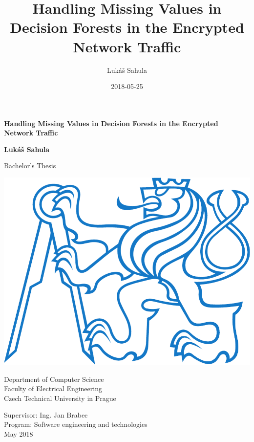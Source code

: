 \documentclass[11pt]{article}
\title{Handling Missing Values in Decision Forests in the Encrypted Network Traffic}
\date{2018-05-25}
\author{Lukáš Sahula}
\begin{document}
  \begin{titlepage}
    \begin{center}
      \vspace*{1cm}

      \textbf{Handling Missing Values in Decision Forests in the Encrypted Network Traffic}

      \vspace{0.5cm}

      \textbf{Lukáš Sahula}
      \vspace{0.5cm}

      Bachelor's Thesis \\

      \vspace{2cm}

      \includegraphics[scale=0.2]{thesis_res/ctu_logo_blue.pdf}

      \vspace{1cm}
      Department of Computer Science \\
      {\large Faculty of Electrical Engineering \\}
      {\LARGE Czech Technical University in Prague \\}

      \vspace{5.5cm}

    \end{center}

    \noindent Supervisor: Ing. Jan Brabec \\
    Program: Software engineering and technologies \\
    May 2018 \\
    
    
  \end{titlepage}
  \thispagestyle{empty}
  \newpage
  \thispagestyle{empty}
  \mbox{}
  \newpage
  
  \newpage
  \thispagestyle{empty}
  \mbox{}
  \newpage
\end{document}
